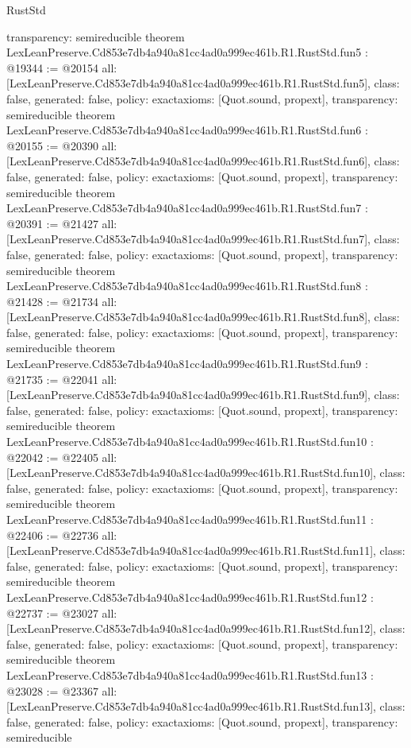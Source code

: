 \begin{lexlean}{RustStd}
\begin{coremodule}
{  transparency: semireducible
}
theorem LexLeanPreserve.Cd853e7db4a940a81cc4ad0a999ec461b.R1.RustStd.fun5 : @19344 := @20154 {
  all: [LexLeanPreserve.Cd853e7db4a940a81cc4ad0a999ec461b.R1.RustStd.fun5],
  class: false,
  generated: false,
  policy: exact{axioms: [Quot.sound, propext]},
  transparency: semireducible
}
theorem LexLeanPreserve.Cd853e7db4a940a81cc4ad0a999ec461b.R1.RustStd.fun6 : @20155 := @20390 {
  all: [LexLeanPreserve.Cd853e7db4a940a81cc4ad0a999ec461b.R1.RustStd.fun6],
  class: false,
  generated: false,
  policy: exact{axioms: [Quot.sound, propext]},
  transparency: semireducible
}
theorem LexLeanPreserve.Cd853e7db4a940a81cc4ad0a999ec461b.R1.RustStd.fun7 : @20391 := @21427 {
  all: [LexLeanPreserve.Cd853e7db4a940a81cc4ad0a999ec461b.R1.RustStd.fun7],
  class: false,
  generated: false,
  policy: exact{axioms: [Quot.sound, propext]},
  transparency: semireducible
}
theorem LexLeanPreserve.Cd853e7db4a940a81cc4ad0a999ec461b.R1.RustStd.fun8 : @21428 := @21734 {
  all: [LexLeanPreserve.Cd853e7db4a940a81cc4ad0a999ec461b.R1.RustStd.fun8],
  class: false,
  generated: false,
  policy: exact{axioms: [Quot.sound, propext]},
  transparency: semireducible
}
theorem LexLeanPreserve.Cd853e7db4a940a81cc4ad0a999ec461b.R1.RustStd.fun9 : @21735 := @22041 {
  all: [LexLeanPreserve.Cd853e7db4a940a81cc4ad0a999ec461b.R1.RustStd.fun9],
  class: false,
  generated: false,
  policy: exact{axioms: [Quot.sound, propext]},
  transparency: semireducible
}
theorem LexLeanPreserve.Cd853e7db4a940a81cc4ad0a999ec461b.R1.RustStd.fun10 : @22042 := @22405 {
  all: [LexLeanPreserve.Cd853e7db4a940a81cc4ad0a999ec461b.R1.RustStd.fun10],
  class: false,
  generated: false,
  policy: exact{axioms: [Quot.sound, propext]},
  transparency: semireducible
}
theorem LexLeanPreserve.Cd853e7db4a940a81cc4ad0a999ec461b.R1.RustStd.fun11 : @22406 := @22736 {
  all: [LexLeanPreserve.Cd853e7db4a940a81cc4ad0a999ec461b.R1.RustStd.fun11],
  class: false,
  generated: false,
  policy: exact{axioms: [Quot.sound, propext]},
  transparency: semireducible
}
theorem LexLeanPreserve.Cd853e7db4a940a81cc4ad0a999ec461b.R1.RustStd.fun12 : @22737 := @23027 {
  all: [LexLeanPreserve.Cd853e7db4a940a81cc4ad0a999ec461b.R1.RustStd.fun12],
  class: false,
  generated: false,
  policy: exact{axioms: [Quot.sound, propext]},
  transparency: semireducible
}
theorem LexLeanPreserve.Cd853e7db4a940a81cc4ad0a999ec461b.R1.RustStd.fun13 : @23028 := @23367 {
  all: [LexLeanPreserve.Cd853e7db4a940a81cc4ad0a999ec461b.R1.RustStd.fun13],
  class: false,
  generated: false,
  policy: exact{axioms: [Quot.sound, propext]},
  transparency: semireducible
}
\end{coremodule}
\end{lexlean}

